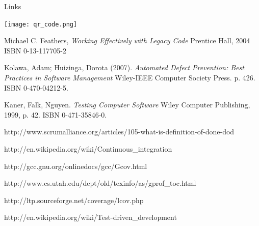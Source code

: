 \documentclass{beamer}
\begin{document}
\begin{frame}{Links}

\begin{center}
\texttt{[image: qr\_code.png]}
\end{center}


\tiny
\begin{thebibliography}{100}

Michael C. Feathers, \emph{Working Effectively with Legacy Code} Prentice Hall, 2004 ISBN 0-13-117705-2

Kolawa, Adam; Huizinga, Dorota (2007). \emph{Automated Defect Prevention: Best Practices in Software Management} Wiley-IEEE Computer Society Press. p. 426. ISBN 0-470-04212-5.

Kaner, Falk, Nguyen. \emph{Testing Computer Software} Wiley Computer Publishing, 1999, p. 42. ISBN 0-471-35846-0.

http://www.scrumalliance.org/articles/105-what-is-definition-of-done-dod

http://en.wikipedia.org/wiki/Continuous_integration

http://gcc.gnu.org/onlinedocs/gcc/Gcov.html

http://www.cs.utah.edu/dept/old/texinfo/as/gprof_toc.html

http://ltp.sourceforge.net/coverage/lcov.php

http://en.wikipedia.org/wiki/Test-driven_development

\end{thebibliography}
\end{frame}

\end{document}
